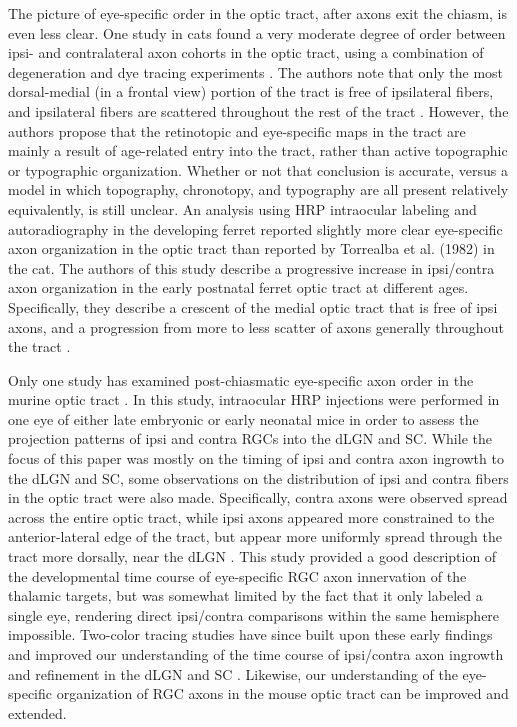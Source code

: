 The picture of eye-specific order in the optic tract, after axons exit the chiasm, is even less clear.
One study in cats found a very moderate degree of order between ipsi- and contralateral axon cohorts in the optic tract, using a combination of degeneration and dye tracing experiments \cite{torrealba1982studies}.
The authors note that only the most dorsal-medial (in a frontal view) portion of the tract is free of ipsilateral fibers, and ipsilateral fibers are scattered throughout the rest of the tract \cite{torrealba1982studies}.
However, the authors propose that the retinotopic and eye-specific maps in the tract are mainly a result of age-related entry into the tract, rather than active topographic or typographic organization.
Whether or not that conclusion is accurate, versus a model in which topography, chronotopy, and typography are all present relatively equivalently, is still unclear.
An analysis using HRP intraocular labeling and autoradiography in the developing ferret reported slightly more clear eye-specific axon organization in the optic tract \cite{linden1981dorsal} than reported by Torrealba et al. (1982) in the cat.
The authors of this study describe a progressive increase in ipsi/contra axon organization in the early postnatal ferret optic tract at different ages.
Specifically, they describe a crescent of the medial optic tract that is free of ipsi axons, and a progression from more to less scatter of axons generally throughout the tract \cite{linden1981dorsal}.

Only one study has examined post-chiasmatic eye-specific axon order in the murine optic tract \cite{godement1984prenatal}.
In this study, intraocular HRP injections were performed in one eye of either late embryonic or early neonatal mice in order to assess the projection patterns of ipsi and contra RGCs into the dLGN and SC.
While the focus of this paper was mostly on the timing of ipsi and contra axon ingrowth to the dLGN and SC, some observations on the distribution of ipsi and contra fibers in the optic tract were also made.
Specifically, contra axons were observed spread across the entire optic tract, while ipsi axons appeared more constrained to the anterior-lateral edge of the tract, but appear more uniformly spread through the tract more dorsally, near the dLGN \cite{godement1984prenatal}.
This study provided a good description of the developmental time course of eye-specific RGC axon innervation of the thalamic targets, but was somewhat limited by the fact that it only labeled a single eye, rendering direct ipsi/contra comparisons within the same hemisphere impossible.
Two-color tracing studies have since built upon these early findings and improved our understanding of the time course of ipsi/contra axon ingrowth and refinement in the dLGN and SC \cite[e.g.][]{jaubert2005structural}.
Likewise, our understanding of the eye-specific organization of RGC axons in the mouse optic tract can be improved and extended.

